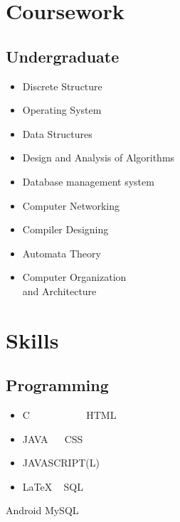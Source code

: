 \documentclass[]{deedy-resume-openfont}
\begin{document}
\begin{minipage}[t]{0.33\textwidth}




\section{Coursework}
\subsection{Undergraduate}
\begin{itemize}
\setlength\itemsep{0.01em}
\item Discrete Structure\\
\item Operating System\\
\item Data Structures \\
\item Design and Analysis of Algorithms \\
\item Database management system\\
\item Computer Networking \\
\item Compiler Designing\\
\item Automata Theory\\
\item Computer Organization\\
and Architecture\\
\end{itemize}
\sectionsep

\section{Skills}
\subsection{Programming}
\begin{itemize}
\setlength\itemsep{0.001em}
\item C \ \  \ \  \  \ \ \ \ \ \textbullet{} HTML
\item JAVA \ \ \textbullet{} CSS

\item JAVASCRIPT(L)
\item LaTeX \ \textbullet{} SQL
\end{itemize}
\textbullet{} Android \textbullet{} MySQL 
\sectionsep

%
%

\end{minipage} 
\end{document}
